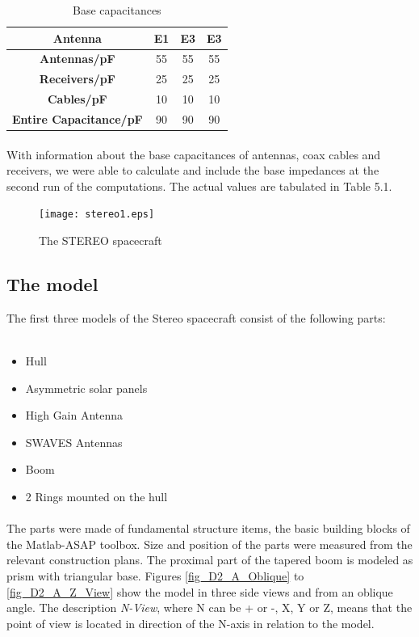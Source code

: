 \documentclass[a4paper,10pt]{thesis}
\begin{document}
\begin{table}[h]
\centering
\label{tab_base_caps55}
\caption{Base capacitances}
\begin{tabular}{|c|c|c|c|}
 \hline
\textbf{Antenna} & \textbf{E1} & \textbf{E3} & \textbf{E3} \\
\hline
\textbf{Antennas/pF} & 55 & 55 & 55 \\
\textbf{Receivers/pF}& 25 & 25 & 25 \\
\textbf{Cables/pF} & 10 & 10 & 10 \\
\hline
\textbf{Entire Capacitance/pF} & 90 & 90 & 90 \\
\hline\end{tabular}
\end{table}

\paragraph*{}
With information about the base capacitances of antennas, coax cables and receivers, we were able to calculate and include the base impedances at the second run of the computations. The actual values are tabulated in Table 5.1. \\


\begin{figure}[h]
  \texttt{[image: stereo1.eps]}\\
  \caption{The STEREO spacecraft}\label{fig_stereo}
\end{figure}

\subsection{The model}
The first three models of the Stereo spacecraft consist of the following parts:\\
\\
\begin{itemize}
\item Hull
\item Asymmetric solar panels
\item High Gain Antenna
\item SWAVES Antennas
\item Boom
\item 2 Rings mounted on the hull
\end{itemize}

\paragraph*{}
The parts were made of fundamental structure items, the basic building blocks of the Matlab-ASAP toolbox. Size and position of the parts were measured from the relevant construction plans. The proximal part of
the tapered boom is modeled as prism with triangular base. Figures \ref{fig_D2_A_Oblique} to \ref{fig_D2_A_Z_View} show the model in three side views and from an oblique angle. The description \emph{N-View}, where N can be + or -, X, Y or Z, means that the point of view is located in direction of the N-axis in relation to the model.\\
\end{document}

